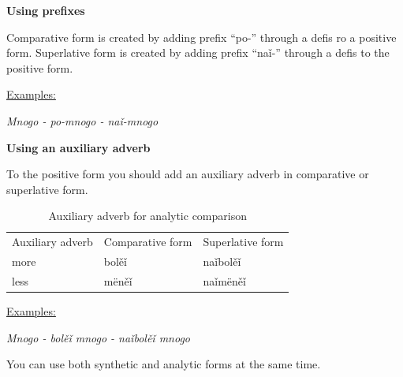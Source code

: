 \textbf{Using prefixes}

Comparative form is created by adding prefix “po-” through a defis ro a positive form. Superlative form is created by adding prefix “naǐ-” through a defis to the positive form.

\underline{Examples:}

\textit{Mnogo - po-mnogo - naǐ-mnogo}

\textbf{Using an auxiliary adverb}

To the positive form you should add an auxiliary adverb in comparative or superlative form.

\begin{table}[!htb]
	\caption{Auxiliary adverb for analytic comparison}
	\begin{tabular}{lll}
		Auxiliary adverb
		& Comparative form
		& Superlative form \\
		more & bolěǐ & naǐbolěǐ \\
		less & mëněǐ & naǐmëněǐ \\
	\end{tabular}
\end{table}

\underline{Examples:}

\textit{Mnogo - bolěǐ mnogo - naǐbolěǐ mnogo}

You can use both synthetic and analytic forms at the same time.
